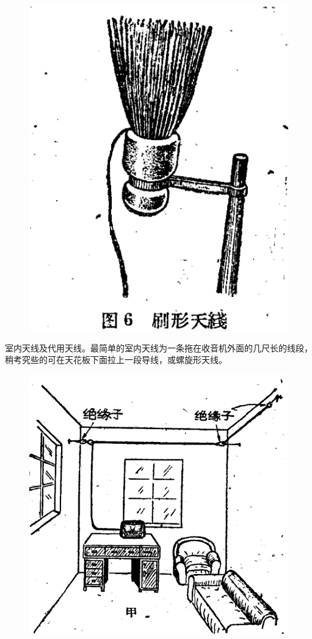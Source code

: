 \documentclass[12pt,UTF8]{ctexbook}
\begin{document}
\begin{figure}[htbp]
	\centering
	\includegraphics[width=0.7\linewidth]{6}
	\caption{}
	\label{fig:1}
\end{figure}

室内天线及代用天线。最简单的室内天线为一条拖在收音机外面的几尺长的线段，稍考究些的可在天花板下面拉上一段导线，或螺旋形天线。

\begin{figure}[htbp]
	\centering
	\includegraphics[width=0.7\linewidth]{7}
	\caption{}
	\label{fig:1}
\end{figure}
\end{document}
